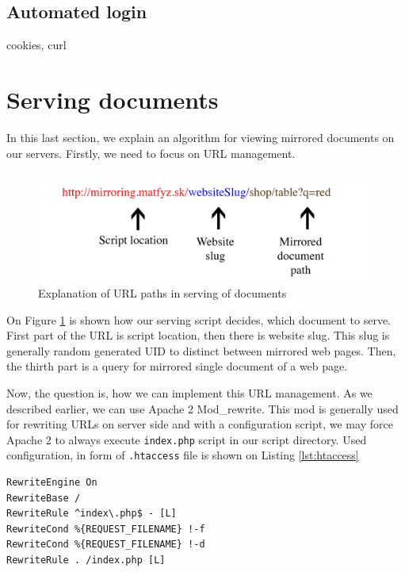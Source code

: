 
\subsection{Automated login}
\label{sec:login}
cookies, curl




\section{Serving documents}
\label{sec:serving}
In this last section, we explain an algorithm for viewing mirrored documents on our servers. Firstly, we need to focus on URL management.

\begin{figure}[h]
    \centering
    \includegraphics[width=\textwidth]{images/urls.png}
    \caption{Explanation of URL paths in serving of documents}
    \label{fig:urls}
\end{figure}

On Figure \ref{fig:urls} is shown how our serving script decides, which document to serve. First part of the URL is script location, then there is website slug. This slug is generally random generated UID to distinct between mirrored web pages. Then, the thirth part is a query for mirrored single document of a web page.

Now, the question is, how we can implement this URL management. As we described earlier, we can use Apache 2 Mod\_rewrite. This mod is generally used for rewriting URLs on server side and with a configuration script, we may force Apache 2 to always execute \texttt{index.php} script in our script directory. Used configuration, in form of \texttt{.htaccess} file is shown on Listing \ref{lst:htaccess}

\begin{lstlisting}[caption={Example of .htaccess for Apache 2 mod\_rewrite},label={lst:htaccess}]
RewriteEngine On
RewriteBase /
RewriteRule ^index\.php$ - [L]
RewriteCond %{REQUEST_FILENAME} !-f
RewriteCond %{REQUEST_FILENAME} !-d
RewriteRule . /index.php [L]
\end{lstlisting}

